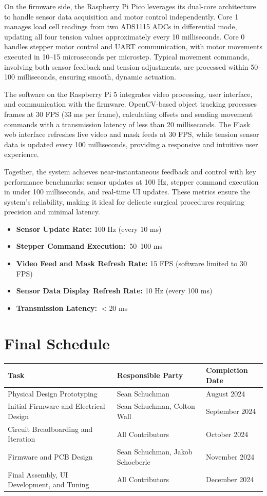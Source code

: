 On the firmware side, the Raspberry Pi Pico leverages its dual-core architecture to handle sensor data acquisition and motor control independently. Core 1 manages load cell readings from two ADS1115 ADCs in differential mode, updating all four tension values approximately every 10 milliseconds. Core 0 handles stepper motor control and UART communication, with motor movements executed in 10–15 microseconds per microstep. Typical movement commands, involving both sensor feedback and tension adjustments, are processed within 50–100 milliseconds, ensuring smooth, dynamic actuation.

The software on the Raspberry Pi 5 integrates video processing, user interface, and communication with the firmware. OpenCV-based object tracking processes frames at 30 FPS (33 ms per frame), calculating offsets and sending movement commands with a transmission latency of less than 20 milliseconds. The Flask web interface refreshes live video and mask feeds at 30 FPS, while tension sensor data is updated every 100 milliseconds, providing a responsive and intuitive user experience.

Together, the system achieves near-instantaneous feedback and control with key performance benchmarks: sensor updates at 100 Hz, stepper command execution in under 100 milliseconds, and real-time UI updates. These metrics ensure the system's reliability, making it ideal for delicate surgical procedures requiring precision and minimal latency.

\begin{itemize}
    \item \textbf{Sensor Update Rate:} 100 Hz (every 10 ms)
    \item \textbf{Stepper Command Execution:} $~$50–100 ms
    \item \textbf{Video Feed and Mask Refresh Rate:} 15 FPS (software limited to 30 FPS)
    \item \textbf{Sensor Data Display Refresh Rate:} 10 Hz (every 100 ms)
    \item \textbf{Transmission Latency:} $<$20 ms
\end{itemize}


\newpage
\section{Final Schedule}

\begin{tabular}{|l|l|l|}
    \hline
    \textbf{Task} & \textbf{Responsible Party} & \textbf{Completion Date} \\ \hline
    Physical Design Prototyping & Sean Schuchman & August 2024 \\ \hline
    Initial Firmware and Electrical Design & Sean Schuchman, Colton Wall & September 2024 \\ \hline
    Circuit Breadboarding and Iteration & All Contributors & October 2024 \\ \hline
    Firmware and PCB Design & Sean Schuchman, Jakob Schoeberle & November 2024 \\ \hline
    Final Assembly, UI Development, and Tuning & All Contributors & December 2024 \\ \hline
\end{tabular}

